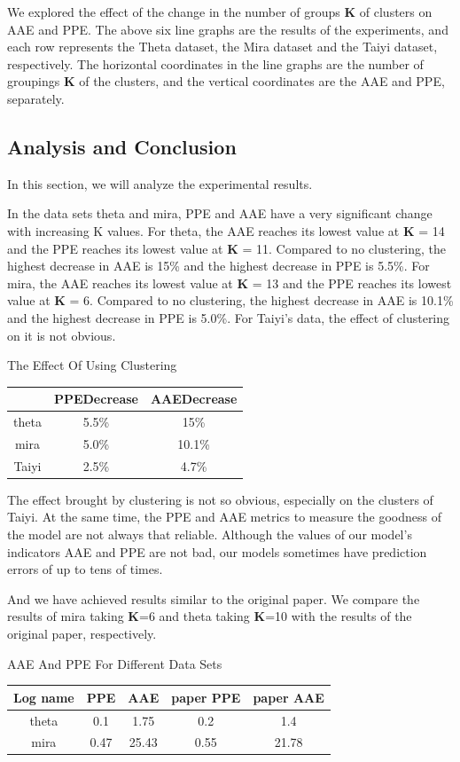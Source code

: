 \documentclass[conference,compsoc]{IEEEtran}
\begin{document}
We explored the effect of the change in the number of groups \textbf{K} of clusters on AAE and PPE. The above six line graphs are the results of the experiments, and each row represents the Theta dataset, the Mira dataset and the Taiyi dataset, respectively. The horizontal coordinates in the line graphs are the number of groupings \textbf{K} of the clusters, and the vertical coordinates are the AAE and PPE, separately.


\subsection{Analysis and Conclusion}
In this section, we will analyze the experimental results.

In the data sets theta and mira, PPE and AAE have a very significant change with increasing K values. For theta, the AAE reaches its lowest value at \textbf{K} = 14 and the PPE reaches its lowest value at \textbf{K} = 11. Compared to no clustering, the highest decrease in AAE is 15\% and the highest decrease in PPE is 5.5\%. For mira, the AAE reaches its lowest value at \textbf{K} = 13 and the PPE reaches its lowest value at \textbf{K} = 6. Compared to no clustering, the highest decrease in AAE is 10.1\% and the highest decrease in PPE is 5.0\%. For Taiyi's data, the effect of clustering on it is not obvious. 


\begin{center}
	The Effect Of Using Clustering
	\\
	\begin{tabular}{|c|c|c|} 
		\hline
		&  PPEDecrease & AAEDecrease\\ [0.5ex] 
		\hline\hline
		theta&5.5\% &15\%\\
		\hline
		mira& 5.0\%&10.1\%\\
		\hline
		Taiyi&2.5\%&4.7\%\\
		\hline
	\end{tabular}
	\label{table:improve}
\end{center}


The effect brought by clustering is not so obvious, especially on the clusters of Taiyi. At the same time, the PPE and AAE metrics to measure the goodness of the model are not always that reliable. Although the values of our model's indicators AAE and PPE are not bad, our models sometimes have prediction errors of up to tens of times. 

And we have achieved results similar to the original paper. We compare the results of mira taking \textbf{K}=6 and theta taking \textbf{K}=10 with the results of the original paper, respectively.  
\begin{center}
	AAE And PPE For Different Data Sets
	\\
	\begin{tabular}{|c|c|c|c|c|} 
		\hline
		Log name &  PPE & AAE & paper PPE & paper AAE \\[0.5ex] 
		\hline\hline
		theta& 0.1&1.75&0.2&1.4\\
		\hline
		mira &0.47 &25.43&0.55& 21.78\\
		\hline
	\end{tabular}
	\label{table:compare}
\end{center}
\end{document}
